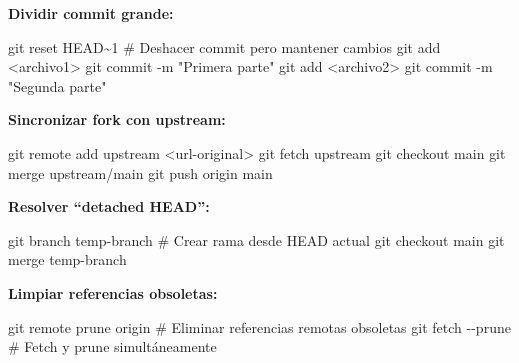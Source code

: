 \documentclass[
  doc,
  floatsintext,
  longtable,
  a4paper,
  nolmodern,
  notxfonts,
  notimes,
  12pt,
  colorlinks=true,linkcolor=blue,citecolor=blue,urlcolor=blue]{apa7}
\newenvironment{Shaded}{\begin{snugshade}}{\end{snugshade}}
\newcommand{\AttributeTok}[1]{\textcolor[rgb]{0.40,0.45,0.13}{#1}}
\newcommand{\CommentTok}[1]{\textcolor[rgb]{0.37,0.37,0.37}{#1}}
\newcommand{\FunctionTok}[1]{\textcolor[rgb]{0.28,0.35,0.67}{#1}}
\newcommand{\NormalTok}[1]{\textcolor[rgb]{0.00,0.23,0.31}{#1}}
\newcommand{\OperatorTok}[1]{\textcolor[rgb]{0.37,0.37,0.37}{#1}}
\newcommand{\StringTok}[1]{\textcolor[rgb]{0.13,0.47,0.30}{#1}}
\begin{document}
\textbf{Dividir commit grande:}

\begin{Shaded}
\begin{Highlighting}[]
\FunctionTok{git}\NormalTok{ reset HEAD\textasciitilde{}1  }\CommentTok{\# Deshacer commit pero mantener cambios}
\FunctionTok{git}\NormalTok{ add }\OperatorTok{\textless{}}\NormalTok{archivo1}\OperatorTok{\textgreater{}}
\FunctionTok{git}\NormalTok{ commit }\AttributeTok{{-}m} \StringTok{"Primera parte"}
\FunctionTok{git}\NormalTok{ add }\OperatorTok{\textless{}}\NormalTok{archivo2}\OperatorTok{\textgreater{}}
\FunctionTok{git}\NormalTok{ commit }\AttributeTok{{-}m} \StringTok{"Segunda parte"}
\end{Highlighting}
\end{Shaded}

\textbf{Sincronizar fork con upstream:}

\begin{Shaded}
\begin{Highlighting}[]
\FunctionTok{git}\NormalTok{ remote add upstream }\OperatorTok{\textless{}}\NormalTok{url{-}original}\OperatorTok{\textgreater{}}
\FunctionTok{git}\NormalTok{ fetch upstream}
\FunctionTok{git}\NormalTok{ checkout main}
\FunctionTok{git}\NormalTok{ merge upstream/main}
\FunctionTok{git}\NormalTok{ push origin main}
\end{Highlighting}
\end{Shaded}

\textbf{Resolver ``detached HEAD'':}

\begin{Shaded}
\begin{Highlighting}[]
\FunctionTok{git}\NormalTok{ branch temp{-}branch  }\CommentTok{\# Crear rama desde HEAD actual}
\FunctionTok{git}\NormalTok{ checkout main}
\FunctionTok{git}\NormalTok{ merge temp{-}branch}
\end{Highlighting}
\end{Shaded}

\textbf{Limpiar referencias obsoletas:}

\begin{Shaded}
\begin{Highlighting}[]
\FunctionTok{git}\NormalTok{ remote prune origin  }\CommentTok{\# Eliminar referencias remotas obsoletas}
\FunctionTok{git}\NormalTok{ fetch }\AttributeTok{{-}{-}prune}        \CommentTok{\# Fetch y prune simultáneamente}
\end{Highlighting}
\end{Shaded}
\end{document}
